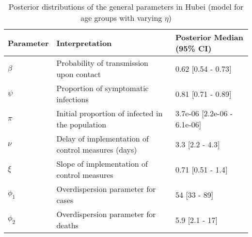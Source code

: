 \begin{table}[ht]
\centering
\begin{tabular}{lp{9cm}p{3cm}}
  \hline
Parameter & Interpretation & Posterior Median (95\% CI) \\ 
  \hline
$\beta$ & Probability of transmission upon contact & 0.62 [0.54 - 0.73] \\ 
  $\psi$ & Proportion of symptomatic infections & 0.81 [0.71 - 0.89] \\ 
  $\pi$ & Initial proportion of infected in the population & 3.7e-06 [2.2e-06 - 6.1e-06] \\ 
  $\nu$ & Delay of implementation of control measures (days) & 3.3 [2.2 - 4.3] \\ 
  $\xi$ & Slope of implementation of control measures & 0.71 [0.51 - 1.4] \\ 
  $\phi_1$ & Overdispersion parameter for cases & 54 [33 - 89] \\ 
  $\phi_2$ & Overdispersion parameter for deaths & 5.9 [2.1 - 17] \\ 
   \hline
\end{tabular}
\caption{Posterior distributions of the general parameters in Hubei (model for age groups with varying $\eta$)} 
\label{tab:ParamTableHubei_Age_VaryingEta}
\end{table}
